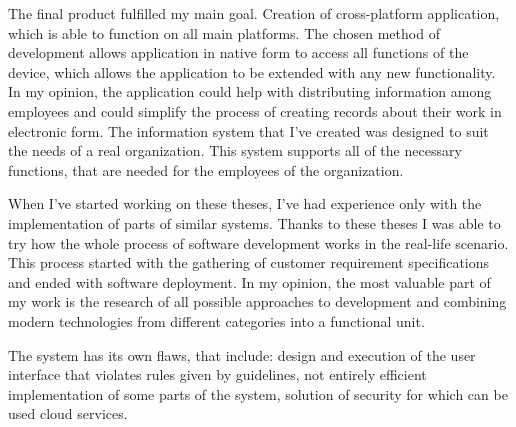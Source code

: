 \documentclass[
  glossaries,
]{kidiplom}
\begin{document}
\begin{kiconclusions}[english]
The final product fulfilled my main goal. Creation of cross-platform application, which is able to function on all main platforms. The chosen method of development allows application in native form to access all functions of the device, which allows the application to be extended with any new functionality. In my opinion, the application could help with distributing information among employees and could simplify the process of creating records about their work in electronic form. The information system that I've created was designed to suit the needs of a real organization. This system supports all of the necessary functions, that are needed for the employees of the organization.


When I've started working on these theses, I've had experience only with the implementation of parts of similar systems. Thanks to these theses I was able to try how the whole process of software development works in the real-life scenario. This process started with the gathering of customer requirement specifications and ended with software deployment. In my opinion, the most valuable part of my work is the research of all possible approaches to development and combining modern technologies from different categories into a functional unit.


The system has its own flaws, that include: design and execution of the user interface that violates rules given by guidelines, not entirely efficient implementation of some parts of the system, solution of security for which can be used cloud services.
\end{kiconclusions}

\appendix
\end{document}
